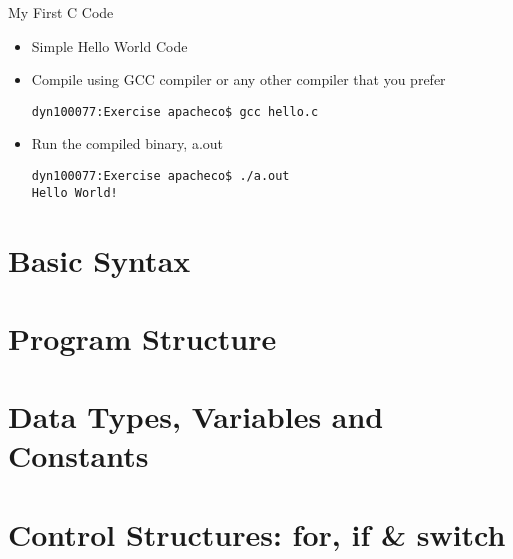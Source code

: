 \documentclass[10pt,t]{beamer}
\begin{document}
\begin{frame}[fragile]{My First C Code}
  \begin{itemize}
    \item Simple Hello World Code
      
    \item Compile using GCC compiler or any other compiler that you prefer
      \begin{lstlisting}[style=LINUX]
dyn100077:Exercise apacheco$ gcc hello.c 
      \end{lstlisting}
    \item Run the compiled binary, a.out
      \begin{lstlisting}[style=LINUX]
dyn100077:Exercise apacheco$ ./a.out 
Hello World!
      \end{lstlisting}
  \end{itemize}
\end{frame}

\section{Basic Syntax}
\section{Program Structure}
\section{Data Types, Variables and Constants}
\section{Control Structures: for, if \& switch}
\end{document}
